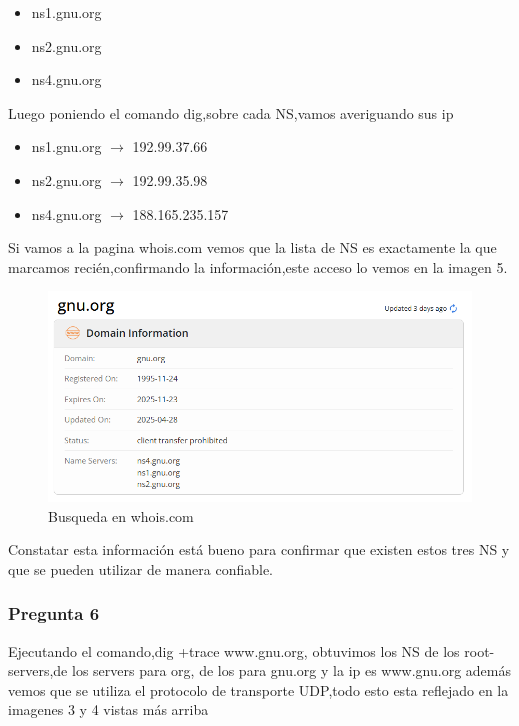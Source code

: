 \documentclass{article}
\begin{document}
\begin{itemize}
\item ns1.gnu.org
\item ns2.gnu.org
\item ns4.gnu.org
\end{itemize}

Luego poniendo el comando dig,sobre cada NS,vamos averiguando sus ip

\begin{itemize}
\item ns1.gnu.org $\rightarrow$  192.99.37.66
\item ns2.gnu.org $\rightarrow$  192.99.35.98
\item ns4.gnu.org $\rightarrow$  188.165.235.157
\end{itemize}



Si vamos a la pagina whois.com vemos que la lista de NS es exactamente la que marcamos recién,confirmando la información,este acceso lo vemos en la imagen 5.

\begin{figure}[h]
    \centering
    \includegraphics[width=1\linewidth]{Fotos/whoIs.png}
     \caption{Busqueda en whois.com}
\end{figure}

Constatar esta información está bueno para confirmar que existen estos tres NS y que se pueden utilizar de manera confiable.

\subsubsection{Pregunta 6}
Ejecutando el comando,dig +trace www.gnu.org, obtuvimos los NS de los root-servers,de los servers para org, de los para gnu.org y la ip es www.gnu.org además vemos que se utiliza el protocolo de transporte UDP,todo esto esta reflejado en la imagenes 3 y 4 vistas más arriba
\end{document}
